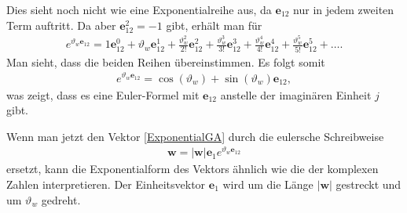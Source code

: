 Dies sieht noch nicht wie eine Exponentialreihe aus, da $\mathbf{e}_{12}$ nur in jedem zweiten Term auftritt.
Da aber $\mathbf{e}_{12}^2=-1$ gibt, erhält man für
\begin{align}
e^{\vartheta_w\mathbf{e}_{12}} = 1 \mathbf{e}_{12}^0+\vartheta_w\mathbf{e}_{12}^1+{\frac {\vartheta_w^{2}}{2!}}\mathbf{e}_{12}^2+{\frac {\vartheta_w^{3}}{3!}}\mathbf{e}_{12}^3+{\frac {\vartheta_w^{4}}{4!}}\mathbf{e}_{12}^4+{\frac {\vartheta_w^{5}}{5!}}\mathbf{e}_{12}^5+\dots.
\label{ExponentialGA2}
\end{align}
Man sieht, dass die beiden Reihen übereinstimmen. Es folgt somit
\begin{align}\label{EulerGA}
e^{\vartheta_w \mathbf{e}_{12}} = \cos(\vartheta_w)+ \sin(\vartheta_w) \mathbf{e}_{12},
\end{align} 
was zeigt, dass es eine Euler-Formel mit $\mathbf{e}_{12}$ anstelle der imaginären Einheit $j$ gibt.

Wenn man jetzt den Vektor \eqref{ExponentialGA} durch die eulersche Schreibweise
\begin{align}
\mathbf{w} = |\mathbf{w}|\mathbf{e}_1e^{\vartheta_w\mathbf{e}_{12}}
\end{align}
ersetzt, kann die Exponentialform des Vektors ähnlich wie die der komplexen Zahlen interpretieren. Der Einheitsvektor $\mathbf{e}_1$ wird um die Länge $|\mathbf{w}|$ gestreckt und um $\vartheta_w$ gedreht.

